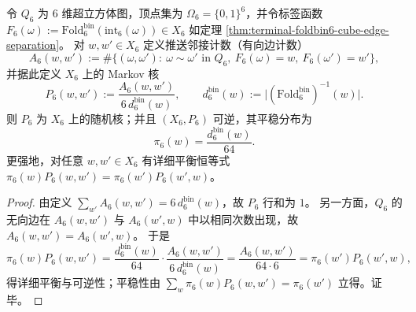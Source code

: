 \begin{enumerate}
  

  \begin{theorem}\label{thm:terminal-foldbin6-pushforward-markov}
  令 \(Q_6\) 为 \(6\) 维超立方体图，顶点集为 \(\Omega_6=\{0,1\}^6\)，并令标签函数
  \(
  F_6(\omega):=\mathrm{Fold}^{\mathrm{bin}}_6(\mathrm{int}_6(\omega))\in X_6
  \)
  如定理 \ref{thm:terminal-foldbin6-cube-edge-separation}。
  对 \(w,w'\in X_6\) 定义推送邻接计数（有向边计数）
  \[
  A_6(w,w')
  :=\#\bigl\{(\omega,\omega'):\ \omega\sim\omega'\text{ in }Q_6,\ F_6(\omega)=w,\ F_6(\omega')=w'\bigr\},
  \]
  并据此定义 \(X_6\) 上的 Markov 核
  \[
  P_6(w,w'):=\frac{A_6(w,w')}{6\,d^{\mathrm{bin}}_6(w)},
  \qquad d^{\mathrm{bin}}_6(w):=\bigl|(\mathrm{Fold}^{\mathrm{bin}}_6)^{-1}(w)\bigr|.
  \]
  则 \(P_6\) 为 \(X_6\) 上的随机核；并且 \((X_6,P_6)\) 可逆，其平稳分布为
  \[
  \pi_6(w)=\frac{d^{\mathrm{bin}}_6(w)}{64}.
  \]
  更强地，对任意 \(w,w'\in X_6\) 有详细平衡恒等式
  \(
  \pi_6(w)P_6(w,w')=\pi_6(w')P_6(w',w)
  \)。
  \end{theorem}
  \begin{proof}
  由定义 \(\sum_{w'}A_6(w,w')=6\,d^{\mathrm{bin}}_6(w)\)，故 \(P_6\) 行和为 \(1\)。
  另一方面，\(Q_6\) 的无向边在 \(A_6(w,w')\) 与 \(A_6(w',w)\) 中以相同次数出现，故 \(A_6(w,w')=A_6(w',w)\)。
  于是
  \[
  \pi_6(w)P_6(w,w')=\frac{d^{\mathrm{bin}}_6(w)}{64}\cdot\frac{A_6(w,w')}{6\,d^{\mathrm{bin}}_6(w)}
  =\frac{A_6(w,w')}{64\cdot 6}
  =\pi_6(w')P_6(w',w),
  \]
  得详细平衡与可逆性；平稳性由 \(\sum_w \pi_6(w)P_6(w,w')=\pi_6(w')\) 立得。证毕。
  \end{proof}
  

  


\end{enumerate}
